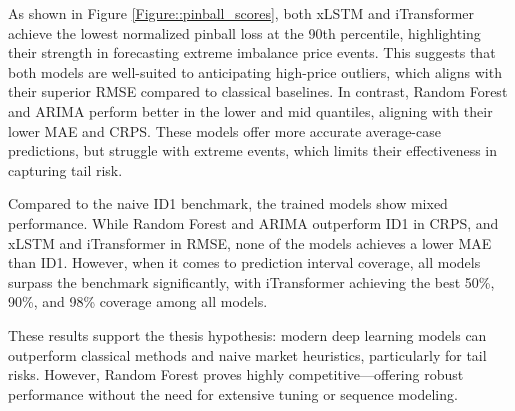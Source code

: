 \documentclass[class=scrbook, crop=false]{standalone}
\begin{document}
As shown in Figure \ref{Figure::pinball_scores}, both xLSTM and iTransformer achieve the lowest normalized pinball loss at the 90th percentile, highlighting their strength in forecasting extreme imbalance price events. This suggests that both models are well-suited to anticipating high-price outliers, which aligns with their superior RMSE compared to classical baselines.
In contrast, Random Forest and ARIMA perform better in the lower and mid quantiles, aligning with their lower MAE and CRPS. These models offer more accurate average-case predictions, but struggle with extreme events, which limits their effectiveness in capturing tail risk.

Compared to the naive ID1 benchmark, the trained models show mixed performance. While Random Forest and ARIMA outperform ID1 in CRPS, and xLSTM and iTransformer in RMSE, none of the models achieves a lower MAE than ID1.
However, when it comes to prediction interval coverage, all models surpass the benchmark significantly, with iTransformer achieving the best 50\%, 90\%, and 98\% coverage among all models.

These results support the thesis hypothesis: modern deep learning models can outperform classical methods and naive market heuristics, particularly for tail risks. However, Random Forest proves highly competitive—offering robust performance without the need for extensive tuning or sequence modeling.
\end{document}
